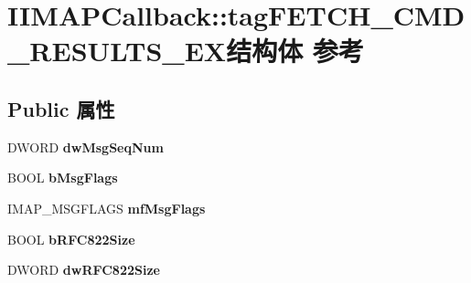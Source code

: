 \hypertarget{struct_i_i_m_a_p_callback_1_1tag_f_e_t_c_h___c_m_d___r_e_s_u_l_t_s___e_x}{}\section{I\+I\+M\+A\+P\+Callback\+:\+:tag\+F\+E\+T\+C\+H\+\_\+\+C\+M\+D\+\_\+\+R\+E\+S\+U\+L\+T\+S\+\_\+\+E\+X结构体 参考}
\label{struct_i_i_m_a_p_callback_1_1tag_f_e_t_c_h___c_m_d___r_e_s_u_l_t_s___e_x}
\subsection*{Public 属性}
\begin{DoxyCompactItemize}
\item 
\mbox{\label{struct_i_i_m_a_p_callback_1_1tag_f_e_t_c_h___c_m_d___r_e_s_u_l_t_s___e_x_a71d99171cc2313a6b63b08e680749fea}} 
D\+W\+O\+RD {\bfseries dw\+Msg\+Seq\+Num}
\item 
\mbox{\label{struct_i_i_m_a_p_callback_1_1tag_f_e_t_c_h___c_m_d___r_e_s_u_l_t_s___e_x_a84ce27526f21c534d46472383da2622f}} 
B\+O\+OL {\bfseries b\+Msg\+Flags}
\item 
\mbox{\label{struct_i_i_m_a_p_callback_1_1tag_f_e_t_c_h___c_m_d___r_e_s_u_l_t_s___e_x_a2e0b9eb1522cac760729d6b0ac2d20bd}} 
I\+M\+A\+P\+\_\+\+M\+S\+G\+F\+L\+A\+GS {\bfseries mf\+Msg\+Flags}
\item 
\mbox{\label{struct_i_i_m_a_p_callback_1_1tag_f_e_t_c_h___c_m_d___r_e_s_u_l_t_s___e_x_afcdb2a4eda5312ce30a846abfbbbe4ef}} 
B\+O\+OL {\bfseries b\+R\+F\+C822\+Size}
\item 
\mbox{\label{struct_i_i_m_a_p_callback_1_1tag_f_e_t_c_h___c_m_d___r_e_s_u_l_t_s___e_x_acaf816f2e8f2c2669477be2f72fd69ad}} 
D\+W\+O\+RD {\bfseries dw\+R\+F\+C822\+Size}
\item 

\end{DoxyCompactItemize}
